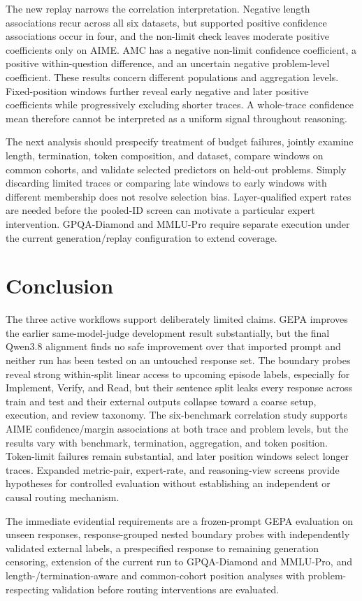 The new replay narrows the correlation interpretation. Negative length
associations recur across all six datasets, but supported positive confidence
associations occur in four, and the non-limit check leaves moderate positive
coefficients only on AIME. AMC has a negative non-limit confidence coefficient,
a positive within-question difference, and an uncertain negative
problem-level coefficient. These results concern different populations and
aggregation levels. Fixed-position windows further reveal early negative
and later positive coefficients while progressively excluding shorter traces.
A whole-trace confidence mean therefore cannot be interpreted as a uniform
signal throughout reasoning.

The next analysis should prespecify treatment of budget failures, jointly
examine length, termination, token composition, and dataset, compare windows
on common cohorts, and validate selected predictors on held-out problems.
Simply discarding limited traces or comparing late windows to early windows
with different membership does not resolve selection bias. Layer-qualified
expert rates are needed before the pooled-ID screen can motivate a particular
expert intervention. GPQA-Diamond and MMLU-Pro require separate execution
under the current generation/replay configuration to extend coverage.

\section{Conclusion}

The three active workflows support deliberately limited claims.  GEPA improves
the earlier same-model-judge development result substantially, but the final
Qwen3.8 alignment finds no safe improvement over that imported prompt and
neither run has been tested on an untouched response set.  The boundary probes reveal strong within-split
linear access to upcoming episode labels, especially for Implement, Verify,
and Read, but their sentence split leaks every response across train and test
and their external outputs collapse toward a coarse setup, execution, and
review taxonomy. The six-benchmark correlation study supports AIME
confidence/margin associations at both trace and problem levels, but the
results vary with benchmark, termination, aggregation, and token position.
Token-limit failures remain substantial, and later position windows select
longer traces. Expanded metric-pair, expert-rate, and reasoning-view screens
provide hypotheses for controlled evaluation without establishing an
independent or causal routing mechanism.

The immediate evidential requirements are a frozen-prompt GEPA evaluation on
unseen responses, response-grouped nested boundary probes with independently
validated external labels, a prespecified response to remaining generation
censoring, extension of the current run to GPQA-Diamond and MMLU-Pro, and
length-/termination-aware and common-cohort position analyses with
problem-respecting validation before routing interventions are evaluated.
